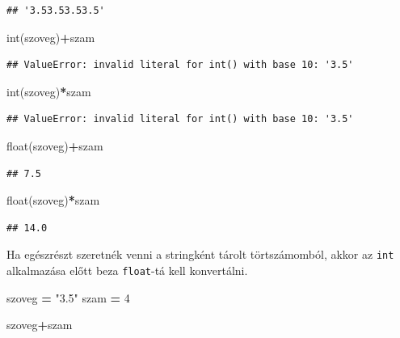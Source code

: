 \documentclass[
]{book}
\newenvironment{Shaded}{\begin{snugshade}}{\end{snugshade}}
\newcommand{\BuiltInTok}[1]{#1}
\newcommand{\DecValTok}[1]{\textcolor[rgb]{0.00,0.00,0.81}{#1}}
\newcommand{\NormalTok}[1]{#1}
\newcommand{\OperatorTok}[1]{\textcolor[rgb]{0.81,0.36,0.00}{\textbf{#1}}}
\newcommand{\StringTok}[1]{\textcolor[rgb]{0.31,0.60,0.02}{#1}}
\begin{document}
\begin{verbatim}
## '3.53.53.53.5'
\end{verbatim}

\begin{Shaded}
\begin{Highlighting}[]
\BuiltInTok{int}\NormalTok{(szoveg)}\OperatorTok{+}\NormalTok{szam}
\end{Highlighting}
\end{Shaded}

\begin{verbatim}
## ValueError: invalid literal for int() with base 10: '3.5'
\end{verbatim}

\begin{Shaded}
\begin{Highlighting}[]
\BuiltInTok{int}\NormalTok{(szoveg)}\OperatorTok{*}\NormalTok{szam}
\end{Highlighting}
\end{Shaded}

\begin{verbatim}
## ValueError: invalid literal for int() with base 10: '3.5'
\end{verbatim}

\begin{Shaded}
\begin{Highlighting}[]
\BuiltInTok{float}\NormalTok{(szoveg)}\OperatorTok{+}\NormalTok{szam}
\end{Highlighting}
\end{Shaded}

\begin{verbatim}
## 7.5
\end{verbatim}

\begin{Shaded}
\begin{Highlighting}[]
\BuiltInTok{float}\NormalTok{(szoveg)}\OperatorTok{*}\NormalTok{szam}
\end{Highlighting}
\end{Shaded}

\begin{verbatim}
## 14.0
\end{verbatim}

Ha egészrészt szeretnék venni a stringként tárolt törtszámomból, akkor az \texttt{int} alkalmazása előtt beza \texttt{float}-tá kell konvertálni.

\begin{Shaded}
\begin{Highlighting}[]
\NormalTok{szoveg }\OperatorTok{=} \StringTok{"3.5"}
\NormalTok{szam }\OperatorTok{=} \DecValTok{4}

\NormalTok{szoveg}\OperatorTok{+}\NormalTok{szam}
\end{Highlighting}
\end{Shaded}
\end{document}
